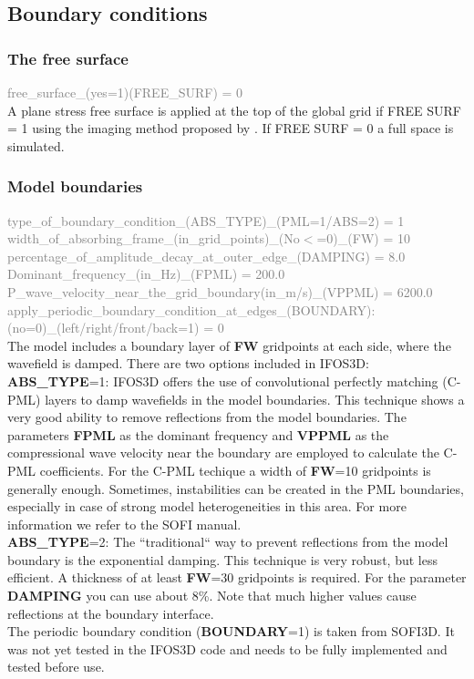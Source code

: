 \subsection{Boundary conditions}
\subsubsection*{The free surface}
\textcolor {Gray}{free\_surface\_(yes=1)(FREE\_SURF) = 0}\vspace{0.1cm}\\
A plane stress free surface is applied at the top of the global grid if FREE SURF = 1 using the imaging method proposed by \citep{Lev88}. If FREE SURF = 0 a full space is simulated.
\subsubsection*{Model boundaries}
\textcolor {Gray}{type\_of\_boundary\_condition\_(ABS\_TYPE)\_(PML=1/ABS=2) = 1\\
width\_of\_absorbing\_frame\_(in\_grid\_points)\_(No$<$=0)\_(FW) = 10\\
percentage\_of\_amplitude\_decay\_at\_outer\_edge\_(DAMPING) = 8.0\\
Dominant\_frequency\_(in\_Hz)\_(FPML) = 200.0\\
P\_wave\_velocity\_near\_the\_grid\_boundary(in\_m/s)\_(VPPML) = 6200.0\\
apply\_periodic\_boundary\_condition\_at\_edges\_(BOUNDARY):\\
(no=0)\_(left/right/front/back=1) = 0 }\vspace{0.1cm}\\
The model includes a boundary layer of \textbf{FW} gridpoints at each side, where the wavefield is damped. There are two options included in IFOS3D:\\
\textbf{ABS\_TYPE}=1: IFOS3D offers the use of convolutional perfectly matching (C-PML) layers to damp wavefields in the model boundaries. This technique shows a very good ability to remove reflections from the model boundaries. The parameters \textbf{FPML} as the dominant frequency and \textbf{VPPML} as the compressional wave velocity near the boundary are employed to calculate the C-PML coefficients. For the C-PML techique a width of \textbf{FW}=10 gridpoints is generally enough. Sometimes, instabilities can be created in the PML boundaries, especially in case of strong model heterogeneities in this area. For more information we refer to the SOFI manual.\\
\textbf{ABS\_TYPE}=2: The ``traditional`` way to prevent reflections from the model boundary is the exponential damping. This technique is very robust, but less efficient. A thickness of at least \textbf{FW}=30 gridpoints is required. For the parameter \textbf{DAMPING} you can use about 8\%. Note that much higher values cause reflections at the boundary interface.\\
The periodic boundary condition (\textbf{BOUNDARY}=1) is taken from SOFI3D. It was not yet tested in the IFOS3D code and needs to be fully implemented and tested before use.

